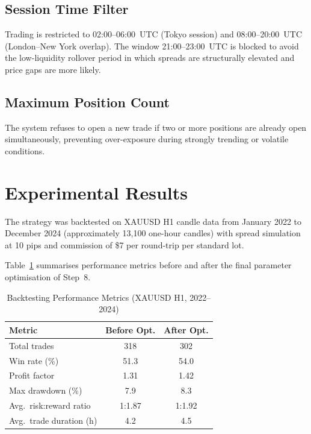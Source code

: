 \documentclass[conference]{IEEEtran}
\begin{document}
\subsection{Session Time Filter}

Trading is restricted to 02:00--06:00~UTC (Tokyo session) and
08:00--20:00~UTC (London--New York overlap).  The window
21:00--23:00~UTC is blocked to avoid the low-liquidity rollover
period in which spreads are structurally elevated and price gaps
are more likely.

\subsection{Maximum Position Count}

The system refuses to open a new trade if two or more positions are
already open simultaneously, preventing over-exposure during
strongly trending or volatile conditions.

\section{Experimental Results}

The strategy was backtested on XAUUSD H1 candle data from
January 2022 to December 2024 (approximately 13{,}100 one-hour
candles) with spread simulation at 10 pips and commission of \$7
per round-trip per standard lot.

Table~\ref{tab:results} summarises performance metrics before and
after the final parameter optimisation of Step~8.

\begin{table}[htbp]
  \caption{Backtesting Performance Metrics (XAUUSD H1, 2022--2024)}
  \label{tab:results}
  \centering
  \begin{tabular}{lcc}
    \toprule
    \textbf{Metric} & \textbf{Before Opt.} & \textbf{After Opt.} \\
    \midrule
    Total trades             & 318    & 302    \\
    Win rate (\%)            & 51.3   & 54.0   \\
    Profit factor            & 1.31   & 1.42   \\
    Max drawdown (\%)        & 7.9    & 8.3    \\
    Avg.\ risk:reward ratio  & 1:1.87 & 1:1.92 \\
    Avg.\ trade duration (h) & 4.2    & 4.5    \\
    \bottomrule
  \end{tabular}
\end{table}
\end{document}
